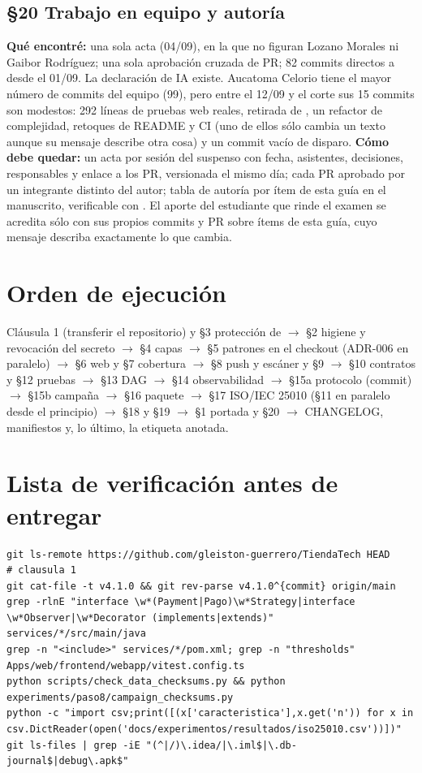 \subsection*{\S20 Trabajo en equipo y autor\'ia}
\textbf{Qu\'e encontr\'e:} una sola acta (04/09), en la que no figuran Lozano Morales ni Gaibor Rodr\'iguez; una sola aprobaci\'on cruzada de PR; 82 commits directos a  desde el 01/09. La declaraci\'on de IA existe. Aucatoma Celorio tiene el mayor n\'umero de commits del equipo (99), pero entre el 12/09 y el corte sus 15 commits son modestos: 292 l\'ineas de pruebas web reales, retirada de , un refactor de complejidad, retoques de README y CI (uno de ellos s\'olo cambia un texto aunque su mensaje describe otra cosa) y un commit vac\'io de disparo. \textbf{C\'omo debe quedar:} un acta por sesi\'on del suspenso con fecha, asistentes, decisiones, responsables y enlace a los PR, versionada el mismo d\'ia; cada PR aprobado por un integrante distinto del autor; tabla de autor\'ia por \'item de esta gu\'ia en el manuscrito, verificable con . El aporte del estudiante que rinde el examen se acredita s\'olo con sus propios commits y PR sobre \'items de esta gu\'ia, cuyo mensaje describa exactamente lo que cambia.

\section{Orden de ejecuci\'on}
Cl\'ausula 1 (transferir el repositorio) y \S3 protecci\'on de  $\rightarrow$ \S2 higiene y revocaci\'on del secreto $\rightarrow$ \S4 capas $\rightarrow$ \S5 patrones en el checkout (ADR-006 en paralelo) $\rightarrow$ \S6 web y \S7 cobertura $\rightarrow$ \S8 push y esc\'aner y \S9 $\rightarrow$ \S10 contratos y \S12 pruebas $\rightarrow$ \S13 DAG $\rightarrow$ \S14 observabilidad $\rightarrow$ \S15a protocolo (commit) $\rightarrow$ \S15b campa\~na $\rightarrow$ \S16 paquete $\rightarrow$ \S17 ISO/IEC 25010 (\S11 en paralelo desde el principio) $\rightarrow$ \S18 y \S19 $\rightarrow$ \S1 portada y \S20 $\rightarrow$ CHANGELOG, manifiestos y, lo \'ultimo, la etiqueta anotada.

\section{Lista de verificaci\'on antes de entregar}
\begin{verbatim}
git ls-remote https://github.com/gleiston-guerrero/TiendaTech HEAD      # clausula 1
git cat-file -t v4.1.0 && git rev-parse v4.1.0^{commit} origin/main
grep -rlnE "interface \w*(Payment|Pago)\w*Strategy|interface \w*Observer|\w*Decorator (implements|extends)" services/*/src/main/java
grep -n "<include>" services/*/pom.xml; grep -n "thresholds" Apps/web/frontend/webapp/vitest.config.ts
python scripts/check_data_checksums.py && python experiments/paso8/campaign_checksums.py
python -c "import csv;print([(x['caracteristica'],x.get('n')) for x in csv.DictReader(open('docs/experimentos/resultados/iso25010.csv'))])"
git ls-files | grep -iE "(^|/)\.idea/|\.iml$|\.db-journal$|debug\.apk$"
\end{verbatim}

\piedepagina

